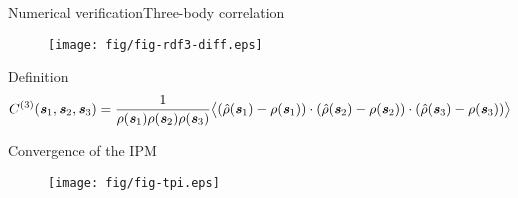 \documentclass[]{beamer}
\newcommand{\bluec}[1]{{\color{blue} #1}}
\newcommand{\vect}[1]{\textbf{\textit{#1}}}
\newcommand{\corr}{C^{(3)}}
\begin{document}
\begin{frame}{Numerical verification}{Three-body correlation}
  \begin{figure}
    \centering 
    \texttt{[image: fig/fig-rdf3-diff.eps]}
  \end{figure}  
  Definition
  \tiny{\bluec{
    \begin{align*}
      \corr (\vect s_1, \vect s_2, \vect s_3)
      =
      \frac1{\rho(\vect s_1)\rho(\vect s_2)\rho(\vect s_3)}
      \big\langle
      (\hat\rho(\vect s_1) - \rho(\vect s_1))\cdot
      (\hat\rho(\vect s_2) - \rho(\vect s_2))\cdot
      (\hat\rho(\vect s_3) - \rho(\vect s_3))
      \big\rangle
    \end{align*}}}
\end{frame}

\begin{frame}{Convergence of the IPM}
  \begin{figure}
    \centering 
    \texttt{[image: fig/fig-tpi.eps]}
  \end{figure}  
\end{frame}
\end{document}
